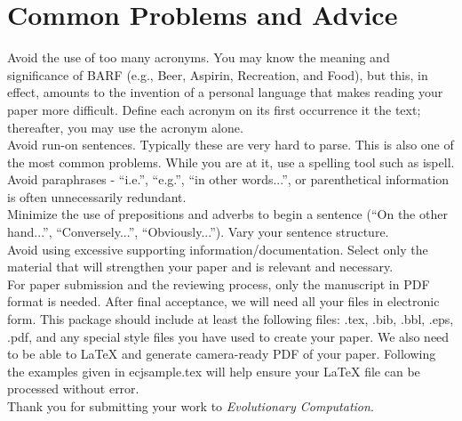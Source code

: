 \documentclass[twoside]{article}
\begin{document}
\section{Common Problems and Advice}

Avoid the use of too many acronyms. You may know the meaning and 
significance of BARF (e.g., Beer, Aspirin, Recreation, and Food), but this, 
in effect, amounts to the invention of a personal language that makes 
reading your paper more difficult.  Define each acronym on its first 
occurrence it the text; thereafter, you may use the acronym alone.\\

Avoid run-on sentences.  Typically these are very hard to parse. This is 
also one of the most common problems. While you are at it, use a spelling 
tool such as ispell.\\

Avoid paraphrases - ``i.e.'', ``e.g.'', ``in other words...'', or 
parenthetical information is often unnecessarily redundant.\\

Minimize the use of prepositions and adverbs to begin a sentence (``On the other hand...'', ``Conversely...'', ``Obviously...'').  Vary your sentence 
structure.\\

Avoid using excessive supporting information/documentation.  Select only the 
material that will strengthen your paper and is relevant and necessary.\\

For paper submission and the reviewing process, only the manuscript in 
PDF format is needed. After final acceptance, we will need all your files 
in electronic form.  This package should include at least the following 
files:  .tex, .bib, .bbl, .eps, .pdf, and any 
special style files you have used to create your paper.  We also need to be 
able to \LaTeX{} and generate camera-ready PDF of your paper. Following 
the examples given in ecjsample.tex will help ensure your \LaTeX{} file can be 
processed without error.\\ 

Thank you for submitting your work to {\em Evolutionary Computation}.

\small



\end{document}
